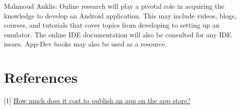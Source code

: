 \documentclass[12pt,letterpaper]{article}
\begin{document}
\noindent Mahmoud Anklis: Online research will play a pivotal role in acquiring the knowledge to develop an Android application. This may include videos, blogs, courses, and tutorials that cover topics from developing to setting up an emulator. The online IDE documentation will also be consulted for any IDE issues. App-Dev books may also be used as a resource.  

\newpage 

\section{References}
[1] \href{https://www.appypie.com/faqs/how-much-does-it-cost-to-publish-an-app-on-the-app-store}{\color{blue}How much does it cost to publish an app on the app store?}
\end{document}
